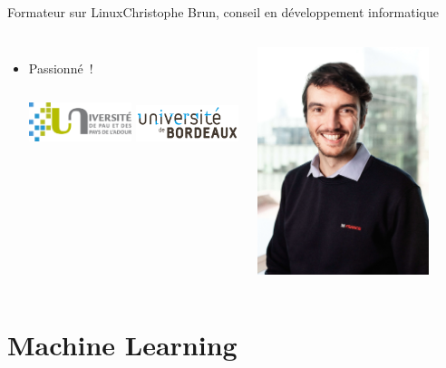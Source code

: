 \documentclass{beamer}
\begin{document}
\begin{frame}{Formateur sur Linux}{Christophe Brun, conseil en développement informatique}
\begin{columns}
\begin{itemize}
                \item Passionné~!
                \bigbreak
                \begin{columns}
                    \centering
                    \includegraphics[width=3cm]{image/logo-uppa}
                    \centering
                    \includegraphics[width=3cm]{image/logo-universite-bordeaux}
                \end{columns}
            \end{itemize}
            \centering
            \includegraphics[width=5cm]{image/trombine-christophe}
        \end{columns}
    \end{frame}


    \section{Machine Learning}\label{sec:ml}
\end{document}
